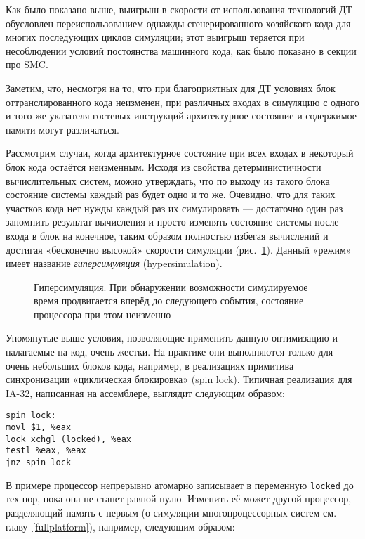 

Как было показано выше, выигрыш в скорости от использования технологий ДТ обусловлен переиспользованием однажды сгенерированного хозяйского кода для многих последующих циклов симуляции; этот выигрыш теряется при несоблюдении условий постоянства машинного кода, как было показано в секции про SMC. 

Заметим, что, несмотря на то, что при благоприятных для ДТ условиях блок оттранслированного кода неизменен, при различных входах в симуляцию с одного и того же указателя гостевых инструкций архитектурное состояние и содержимое памяти могут различаться. 

Рассмотрим случаи, когда архитектурное состояние при всех входах в некоторый блок кода остаётся неизменным. Исходя из свойства детерминистичности вычислительных систем, можно утверждать, что по выходу из такого блока состояние системы каждый раз будет одно и то же. Очевидно, что для таких участков кода нет нужды каждый раз их симулировать — достаточно один раз запомнить результат вычисления и просто изменять состояние системы после входа в блок на конечное, таким образом полностью избегая вычислений и достигая «бесконечно высокой» скорости симуляции (рис.~\ref{fig:hypersim}). Данный «режим» имеет название \textit{гиперсимуляция} (\abbr hypersimulation).

\begin{figure}[htb]
    \centering
    \caption[Гиперсимуляция]{Гиперсимуляция. При обнаружении возможности симулируемое время продвигается вперёд до следующего события, состояние процессора при этом неизменно}
    \label{fig:hypersim}
\end{figure}

Упомянутые выше условия, позволяющие применить данную оптимизацию и налагаемые на код, очень жестки. На практике они выполняются только для очень небольших блоков кода, например, в реализациях примитива синхронизации «циклическая блокировка» (\abbr spin lock). Типичная реализация для IA-32, написанная на ассемблере, выглядит следующим образом:

\begin{lstlisting}
spin_lock:
movl $1, %eax
lock xchgl (locked), %eax
testl %eax, %eax
jnz spin_lock
\end{lstlisting}

В примере процессор непрерывно атомарно записывает в переменную \texttt{locked} до тех пор, пока она не станет равной нулю. Изменить её может другой процессор, разделяющий память с первым (о симуляции многопроцессорных систем см. главу~\ref{fullplatform}), например, следующим образом:

